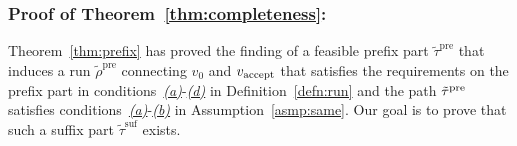\documentclass[Afour,sageh,times]{sagej}
\newcommand{\vertex}[1]{v_{\textup{#1}}}
\begin{document}
{%

\subsubsection{Proof of Theorem~\ref{thm:completeness}:}\label{app:completeness_}
Theorem~\ref{thm:prefix} has proved the finding of a feasible prefix part $\tilde{\tau}^{\text{pre}}$ that induces a run $\tilde{\rho}^{\text{pre}}$ connecting $v_0$ and $\vertex{accept}$ that satisfies the requirements on the prefix part in conditions~\hyperref[cond:a]{\it (a)}-\hyperref[cond:d]{\it (d)} in Definition~\ref{defn:run} and the path $\tilde{\tau}^{\textup{pre}}$ satisfies conditions~\hyperref[asmp:a]{\it (a)}-\hyperref[asmp:b]{\it (b)} in Assumption~\ref{asmp:same}. Our goal is to prove that  such a suffix part $\tilde{\tau}^\text{suf}$ exists.

}
\end{document}
